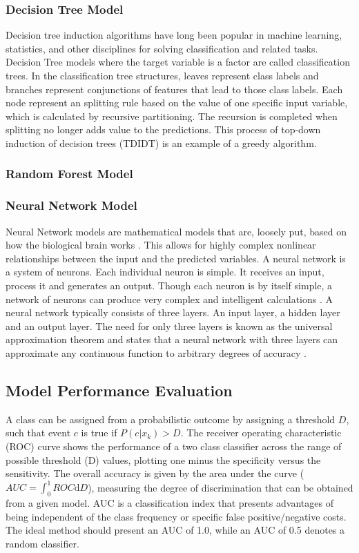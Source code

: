     	\subsubsection{Decision Tree Model}
            \noindent Decision tree induction algorithms have long been popular in machine learning, statistics, and other disciplines for solving classification and related tasks. Decision Tree models where the target variable is a factor are called classification trees. In the classification tree structures, leaves represent class labels and branches represent conjunctions of features that lead to those class labels. Each node represent an splitting rule based on the value of one specific input variable, which is calculated by recursive partitioning. The recursion is completed when splitting no longer adds value to the predictions. This process of top-down induction of decision trees (TDIDT) \citep{quinlan} is an example of a greedy algorithm.
    	\subsubsection{Random Forest Model}
    	\subsubsection{Neural Network Model}
    	\noindent Neural Network models are mathematical models that are, loosely put, based on how the biological brain works \citep{baesens2003using}. This allows for highly complex nonlinear relationships between the input and the predicted variables. 
    	A neural network is a system of neurons. Each individual neuron is simple. It receives an input, process it and generates an output. Though each neuron is by itself simple, a network of neurons can produce very complex and intelligent calculations \citep{shiffman2012nature}. 
    	A neural network typically consists of three layers. An input layer, a hidden layer and an output layer. The need for only three layers is known as the universal approximation theorem and states that a neural network with three layers can approximate any continuous function to arbitrary degrees of accuracy \citep{hornik1989multilayer}.
    \subsection{Model Performance Evaluation}
    \noindent A class can be assigned from a probabilistic outcome by assigning a threshold $D$, such that event $c$ is true if $P\left(c| x_k\right)>D$. The receiver operating characteristic (ROC) curve shows the performance of a two class classifier across the range of possible threshold (D) values, plotting one minus the specificity versus the sensitivity\citep{tom2006an}. The overall accuracy is given by the area under the curve ($AUC = \int_0^1ROC \mathrm{d}D$), measuring the degree of discrimination that can be obtained from a given model. AUC is a classification index\citep{david2011performance} that presents advantages of being independent of the class frequency or specific false positive/negative costs. The ideal method should present an AUC of 1.0, while an AUC of 0.5 denotes a random classifier.
    
